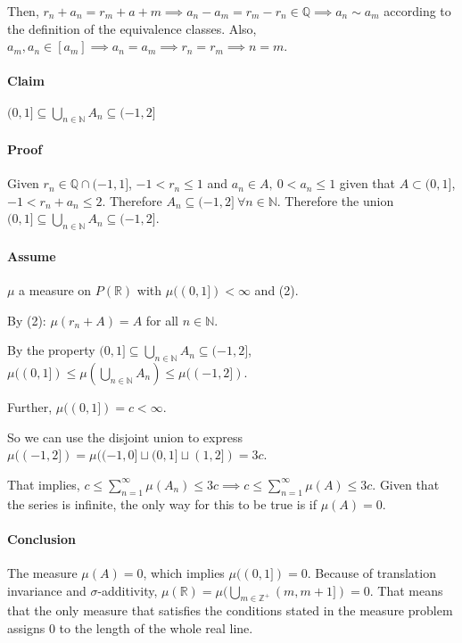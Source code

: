 Then, $r_n + a_n = r_m + a+m  \implies a_n - a_m = r_m - r_n \in \mathbb{Q} \implies a_n \sim a_m$ according to the definition of the equivalence classes. Also, $a_m, a_n \in [a_m] \implies a_n = a_m \implies r_n = r_m \implies n=m$.

\paragraph{Claim}
$(0,1] \subseteq \bigcup_{n\in\mathbb{N}}A_n \subseteq (-1,2]$ 

\paragraph{Proof}
Given $r_n \in \mathbb{Q}\cap (-1,1]$, $-1< r_n \leq 1$ and $a_n \in A,\ 0<a_n\leq 1$ given that $A\subset (0,1]$, $-1 < r_n + a_n \leq 2$. Therefore $A_n \subseteq (-1,2]\ \forall n\in\mathbb{N}$. Therefore the union $(0,1] \subseteq \bigcup_{n\in\mathbb{N}}A_n \subseteq (-1,2]$.


\paragraph{Assume} $\mu$ a measure on $P(\mathbb{R})$ with $\mu((0,1]) < \infty$ and (2). 

By (2):  $\mu(r_n + A) = A$ for all $n\in\mathbb{N}$.

By the property $(0,1] \subseteq \bigcup_{n\in\mathbb{N}}A_n \subseteq (-1,2]$, $\mu((0,1]) \leq \mu(\bigcup_{n\in \mathbb{N}} A_n) \leq \mu((-1,2])$. 
	
Further, $\mu((0,1]) = c < \infty$. 

So we can use the disjoint union to express $\mu((-1,2]) = \mu((-1,0] \sqcup (0,1] \sqcup (1,2]) = 3c$. 

That implies, $c \leq \sum_{n=1}^{\infty}\mu(A_n) \leq 3c \implies c \leq \sum_{n=1}^{\infty}\mu(A) \leq 3c$. Given that the series is infinite, the only way for this to be true is if $\mu(A)=0$. 

\paragraph{Conclusion}
The measure $\mu(A) = 0$, which implies $\mu((0,1]) = 0$. Because of translation invariance and $\sigma$-additivity, $\mu(\mathbb{R}) = \mu(\bigcup_{m\in\mathbb{Z}^+} (m,m+1]) = 0$. That means that the only measure that satisfies the conditions stated in the measure problem assigns $0$ to the length of the whole real line. 


